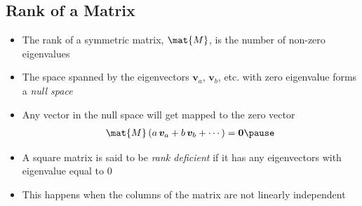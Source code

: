 \begin{slide}
\section[-1]{Rank of a Matrix}

\begin{PauseHighLight}
  \begin{itemize}
  \item The rank of a symmetric matrix, $\mat{M}$, is the number of non-zero
    eigenvalues\pause
  \item The space spanned by the eigenvectors $\bm{v}_a$, $\bm{v}_b$,
    etc.{} with zero eigenvalue forms a \emph{null space}\pause
  \item Any vector in the null space will get mapped to the zero
    vector
    \begin{align*}
      \mat{M} \, (a\, \bm{v}_a + b \, \bm{v}_b + \cdots) = \bm{0}\pause
    \end{align*}
  \item A square matrix is said to be \emph{rank deficient} if it has
    any eigenvectors with eigenvalue equal to 0\pause
   \item This happens when the columns of the matrix are not linearly independent\pause
 \end{itemize}
\end{PauseHighLight}

\end{slide}


